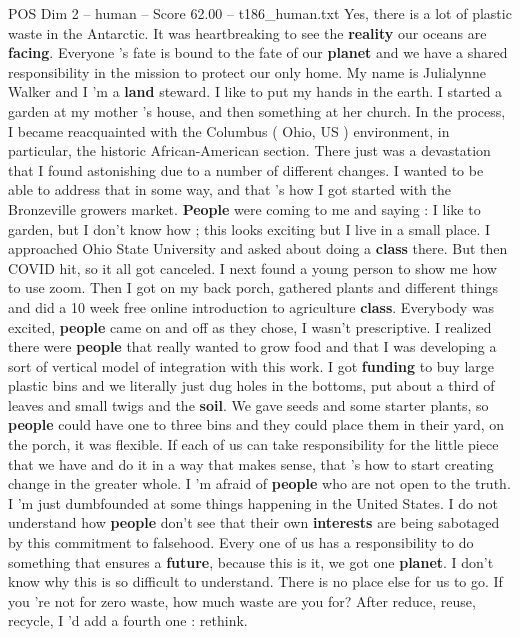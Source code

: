 \begin{textsample}{POS Dim 2 – human – Score 62.00 – t186\_human.txt}
Yes, there is a lot of plastic waste in the Antarctic.
It was heartbreaking to see the \textbf{reality} our oceans are \textbf{facing}.
Everyone ’s fate is bound to the fate of our \textbf{planet} and we have a shared responsibility in the mission to protect our only home.
My name is Julialynne Walker and I ’m a \textbf{land} steward.
I like to put my hands in the earth.
I started a garden at my mother ’s house, and then something at her church.
In the process, I became reacquainted with the Columbus ( Ohio, US ) environment, in particular, the historic African-American section.
There just was a devastation that I found astonishing due to a number of different changes.
I wanted to be able to address that in some way, and that ’s how I got started with the Bronzeville growers market. \textbf{People} were coming to me and saying : I like to garden, but I don't know how ; this looks exciting but I live in a small place.
I approached Ohio State University and asked about doing a \textbf{class} there.
But then COVID hit, so it all got canceled.
I next found a young person to show me how to use zoom.
Then I got on my back porch, gathered plants and different things and did a 10 week free online introduction to agriculture \textbf{class}.
Everybody was excited, \textbf{people} came on and off as they chose, I wasn't prescriptive.
I realized there were \textbf{people} that really wanted to grow food and that I was developing a sort of vertical model of integration with this work.
I got \textbf{funding} to buy large plastic bins and we literally just dug holes in the bottoms, put about a third of leaves and small twigs and the \textbf{soil}.
We gave seeds and some starter plants, so \textbf{people} could have one to three bins and they could place them in their yard, on the porch, it was flexible.
If each of us can take responsibility for the little piece that we have and do it in a way that makes sense, that ’s how to start creating change in the greater whole.
I ’m afraid of \textbf{people} who are not open to the truth.
I ’m just dumbfounded at some things happening in the United States.
I do not understand how \textbf{people} don't see that their own \textbf{interests} are being sabotaged by this commitment to falsehood.
Every one of us has a responsibility to do something that ensures a \textbf{future}, because this is it, we got one \textbf{planet}.
I don't know why this is so difficult to understand.
There is no place else for us to go.
If you ’re not for zero waste, how much waste are you for?
After reduce, reuse, recycle, I ’d add a fourth one : rethink.

\end{textsample}
